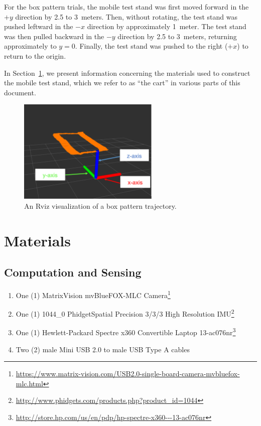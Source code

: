 For the box pattern trials, the mobile test stand was first moved forward in the $+y$ direction by 2.5 to 3~meters. Then, without rotating, the test stand was pushed leftward in the $-x$ direction by approximately 1~meter. The test stand was then pulled backward in the $-y$ direction by 2.5 to 3~meters, returning approximately to $y = 0$. Finally, the test stand was pushed to the right ($+x$) to return to the origin.

In Section~\ref{sec:materials}, we present information concerning the materials used to construct the mobile test stand, which we refer to as ``the cart'' in various parts of this document.

\begin{figure}[H]
  \centering
    \includegraphics[width=0.6\textwidth]{good_box_5_cropped}
  \caption[Rviz Visualization of a Box Pattern Trajectory]{An Rviz visualization of a box pattern trajectory.}
  \label{fig:good_box}
\end{figure}

\pagebreak
\section{Materials} \label{sec:materials}
\subsection{Computation and Sensing}
\begin{enumerate}
\item One (1) MatrixVision mvBlueFOX-MLC Camera\footnote{\url{https://www.matrix-vision.com/USB2.0-single-board-camera-mvbluefox-mlc.html}}
\item One (1) 1044\_0 PhidgetSpatial Precision 3/3/3 High Resolution IMU\footnote{\url{http://www.phidgets.com/products.php?product_id=1044}}
\item One (1) Hewlett-Packard Spectre x360 Convertible Laptop 13-ac076nr\footnote{\url{http://store.hp.com/us/en/pdp/hp-spectre-x360---13-ac076nr}}
\item Two (2) male Mini USB 2.0 to male USB Type A cables
\end{enumerate}

